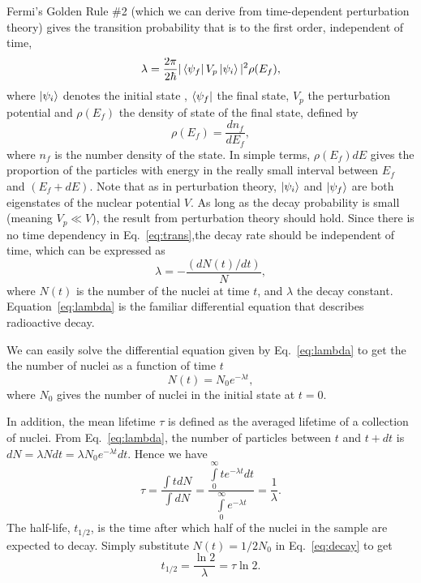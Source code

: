 \documentclass[nofootinbib,preprint,aps]{revtex4-1}
\begin{document}
        Fermi's Golden Rule \#2 (which we can derive from time-dependent
        perturbation theory)
        gives the transition probability that is to the first order, independent of time,
        \begin{equation}
            \label{eq:trans}
            \lambda = \frac{2\pi}{2\hbar}|\bra{\psi_f}V_p\ket{\psi_i}|^2\rho(E_f),
        \end{equation}
        where $\ket{\psi_i}$ denotes the initial state , $\bra{\psi_f}$ the final state, $V_p$ the perturbation
        potential and $\rho(E_f)$ the density of state of the final state, defined by
        \begin{equation}
            \rho(E_f) = \frac{dn_f}{dE_f},
        \end{equation}
        where $n_f$ is the number density of the state. \cite[chapt. 6]{k88}
        In simple terms, $\rho(E_f)dE$ gives the proportion of the particles with energy in the
        really small interval between
        $E_f$ and $(E_f+dE)$.
        Note that as in perturbation theory, $\ket{\psi_i}$ and
        $\ket{\psi_f}$ are both eigenstates of the nuclear potential $V$. As long as
        the decay probability is small (meaning $V_p\ll V$), the result from perturbation theory should hold. Since
        there is no time dependency in Eq.~\ref{eq:trans},the
        decay rate should be independent of time, which can be expressed as
        \begin{equation}
            \label{eq:lambda}
            \lambda = -\frac{(dN(t)/dt)}{N},
        \end{equation}
        where $N(t)$ is the number of the nuclei at time $t$, and $\lambda$ the decay constant.
        Equation~\ref{eq:lambda} is the familiar differential equation that describes radioactive decay.
        
        We can easily solve the differential equation given by Eq.~\ref{eq:lambda} to get
        the the number of nuclei as a function of time $t$
        \begin{equation}
            \label{eq:decay}
            N(t) = N_0 e^{-\lambda t},
        \end{equation}
        where $N_0$ gives the number of nuclei in the initial state at $t=0$.

        In addition, the mean lifetime $\tau$ is defined as the averaged lifetime of a collection of nuclei.
        From Eq.~\ref{eq:lambda}, the number of particles between $t$ and $t+dt$ is $dN=\lambda N dt=\lambda
        N_0 e^{-\lambda t}dt$. Hence we have
        \begin{equation}
            \tau = \frac{\int t dN}{\int dN}=\frac{\int\limits_0^{\infty}t e^{-\lambda t}dt}
            {\int\limits_0^{\infty}e^{-\lambda t}} = \frac{1}{\lambda}.
        \end{equation}
        The half-life, $t_{1/2}$, is the time after which half of the nuclei in the sample are expected to
        decay. Simply substitute $N(t)=1/2N_0$ in Eq.~\ref{eq:decay} to get
        \begin{equation}
            t_{1/2} = \frac{\ln 2}{\lambda}=\tau \ln 2.
        \end{equation}
\end{document}
